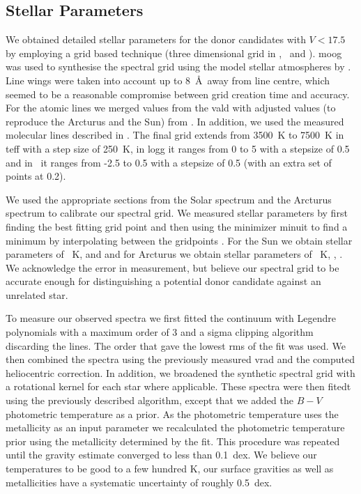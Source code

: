 \subsection{Stellar Parameters}
\label{sec:sn1006_stelparam}

We obtained detailed stellar parameters for the donor candidates with $V<17.5$ by employing a grid based technique (three dimensional grid in \teff, \logg\ and \feh). \gls{moog} was used to synthesise the spectral grid using the model stellar atmospheres by \citet{2003IAUS..210P.A20C}. Line wings were taken into account up to 8~\AA\ away from line centre, which seemed to be a reasonable compromise between grid creation time and accuracy. For the atomic lines we merged values from the \gls{vald} with adjusted values (to reproduce the Arcturus and the Sun) from \cite{2008A&A...486..951G}. In addition, we used the measured molecular lines described in  \citet{1995KurCD..23.....K}. The final grid extends from 3500~K to 7500~K in \gls{teff} with a step size of 250~K, in \gls{logg} it ranges from  0 to 5 with a stepsize of 0.5 and in \feh\ it ranges from -2.5 to 0.5 with a stepsize of 0.5 (with an extra set of points at 0.2). 

We used the appropriate sections from the Solar spectrum \citep{1984sfat.book.....K} and the Arcturus spectrum \citep{2000vnia.book.....H} to calibrate our spectral grid. We measured stellar parameters by first finding the best fitting grid point and then using the minimizer \gls{minuit} to find a minimum by interpolating between the gridpoints \citep[described in Appendix \ref{chap:ndinterp} of this thesis;][]{Barber96thequickhull}. For the Sun we obtain stellar parameters of ~K,  and  and for Arcturus we obtain stellar parameters of ~K, , . We acknowledge the error in measurement, but believe our spectral grid to be accurate enough for distinguishing a potential donor candidate against an unrelated star. 

To measure our observed spectra we first fitted the continuum with Legendre polynomials with a maximum order of 3 and a sigma clipping algorithm discarding the lines. The order that gave the lowest \gls{rms} of the fit was used. We then combined the spectra using the previously measured \gls{vrad} and the computed heliocentric correction. In addition, we broadened the synthetic spectral grid with a rotational kernel for each star where applicable. These spectra were then fitedt using the previously described algorithm, except that we added the $B-V$ photometric temperature as a prior. As the photometric temperature uses the metallicity as an input parameter we recalculated the photometric temperature prior using the metallicity determined by the fit. This procedure was repeated until the gravity estimate converged to less than 0.1~dex. We believe our temperatures to be good to a few hundred K, our surface gravities as well as metallicities have a systematic uncertainty of roughly 0.5~dex. 


